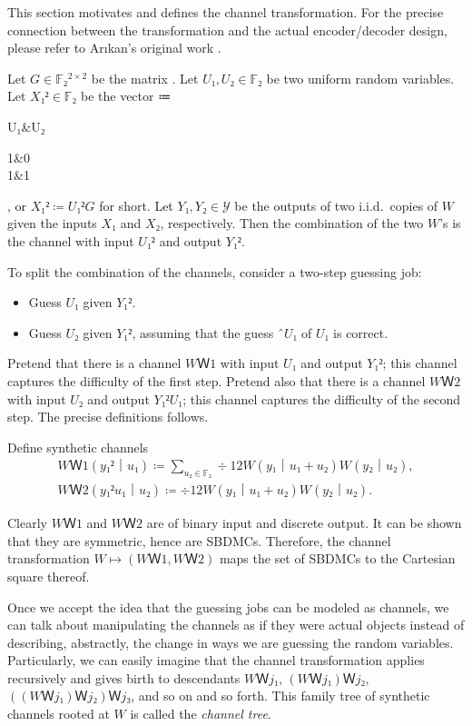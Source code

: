 \documentclass[openany]{amsbook}
\numberwithin{equation}{chapter}
\numberwithin{figure}{chapter}
\numberwithin{table}{chapter}
\def\bma#1{\begin{bmatrix}#1\end{bmatrix}}
\def\[#1\]{\begin{equation*}{#1}\end{equation*}}
\theoremstyle{definition}	理dfn:Definition~?s			理exa:Example~?s
\theoremstyle{remark}		理cla:Claim~?s				理rem:Remark~?s
\begin{document}
	This section motivates and defines the channel transformation.
	For the precise connection between the transformation and the actual encoder/decoder
	design, please refer to Arıkan's original work \cite{Arikan09}.
	
	Let $G∈𝔽₂^{2×2}$ be the matrix
	\[\bma{1&0\\1&1}.\]
	Let $U₁,U₂∈𝔽₂$ be two uniform random variables.
	Let $X₁²∈𝔽₂$ be the vector
	\[\bma{X₁&X₂}≔\bma{U₁&U₂}\bma{1&0\\1&1},\]
	or $X₁²≔U₁²G$ for short.
	Let $Y₁,Y₂∈𝒴$ be the outputs of two i.i.d.\ copies
	of $W$ given the inputs $X₁$ and $X₂$, respectively.
	Then the combination of the two $W$'s is the channel
	with input $U₁²$ and output $Y₁²$.
	
	To split the combination of the channels, consider a two-step guessing job:
	\begin{itemize}
		\item	Guess $U₁$ given $Y₁²$.
		\item	Guess $U₂$ given $Y₁²$,
				assuming that the guess $ˆU₁$ of $U₁$ is correct.
	\end{itemize}
	Pretend that there is a channel $WＷ1$ with input $U₁$ and output $Y₁²$;
	this channel captures the difficulty of the first step.
	Pretend also that there is a channel $WＷ2$ with input $U₂$ and output $Y₁²U₁$;
	this channel captures the difficulty of the second step.
	The precise definitions follows.
	
	\begin{dfn}
		Define synthetic channels
		\begin{gather*}
			WＷ1(y₁²｜u₁)≔∑_{u₂∈𝔽₂}÷12W(y₁｜u₁+u₂)W(y₂｜u₂),	\\
			WＷ2(y₁²u₁｜u₂)≔÷12W(y₁｜u₁+u₂)W(y₂｜u₂).
		\end{gather*}
	\end{dfn}
	
	Clearly $WＷ1$ and $WＷ2$ are of binary input and discrete output.
	It can be shown that they are symmetric, hence are SBDMCs.
	Therefore, the channel transformation $W↦(WＷ1,WＷ2)$
	maps the set of SBDMCs to the Cartesian square thereof.
	
	Once we accept the idea that the guessing jobs can be modeled as channels,
	we can talk about manipulating the channels
	as if they were actual objects instead of describing, abstractly,
	the change in ways we are guessing the random variables.
	Particularly, we can easily imagine that the channel transformation
	applies recursively and gives birth to descendants
	$WＷ{j₁}$, $(WＷ{j₁})Ｗ{j₂}$, $((WＷ{j₁})Ｗ{j₂})Ｗ{j₃}$, and so on and so forth.
	This family tree of synthetic channels
	rooted at $W$ is called the \emph{channel tree}.
	
\end{document}
